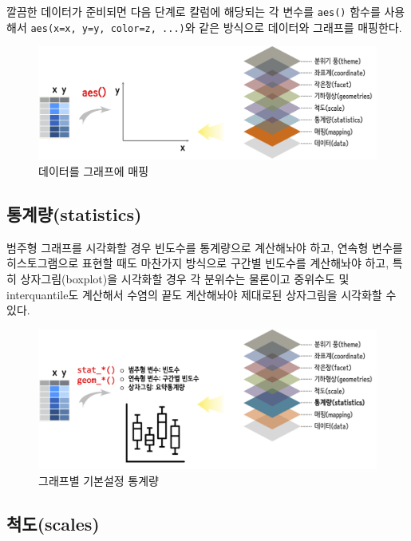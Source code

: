 \documentclass[
]{book}
\begin{document}
깔끔한 데이터가 준비되면 다음 단계로 칼럼에 해당되는 각 변수를 \texttt{aes()} 함수를 사용해서 \texttt{aes(x=x,\ y=y,\ color=z,\ ...)}와 같은 방식으로 데이터와 그래프를 매핑한다.

\begin{figure}
\centering
\includegraphics[width=1\textwidth,height=\textheight]{assets/images/ggplot-mapping.png}
\caption{데이터를 그래프에 매핑}
\end{figure}

\hypertarget{ggplot2-steps-statistics}{%
\subsection{통계량(statistics)}\label{ggplot2-steps-statistics}}

범주형 그래프를 시각화할 경우 빈도수를 통계량으로 계산해놔야 하고, 연속형 변수를 히스토그램으로 표현할 때도 마찬가지 방식으로 구간별 빈도수를 계산해놔야 하고, 특히 상자그림(boxplot)을 시각화할 경우 각 분위수는 물론이고 중위수도 및 interquantile도 계산해서 수염의 끝도 계산해놔야 제대로된 상자그림을 시각화할 수 있다.

\begin{figure}
\centering
\includegraphics[width=1\textwidth,height=\textheight]{assets/images/ggplot-stat.png}
\caption{그래프별 기본설정 통계량}
\end{figure}

\hypertarget{ggplot2-steps-scales}{%
\subsection{척도(scales)}\label{ggplot2-steps-scales}}
\end{document}
